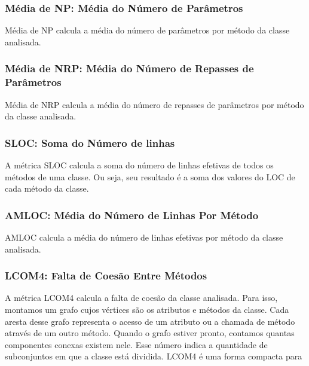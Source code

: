 \subsubsection{Média de NP: Média do Número de Parâmetros}

	Média de NP calcula a média do número de parâmetros por método da classe analisada.
	   


\subsubsection{Média de NRP: Média do Número de Repasses de Parâmetros}        

	Média de NRP calcula a média do número de repasses de parâmetros por método da classe analisada.


                                                        
\subsubsection{SLOC: Soma do Número de linhas}
                                          
	A métrica SLOC calcula a soma do número de linhas efetivas de todos os métodos de uma classe. Ou seja, seu resultado é a soma dos valores do LOC de cada método da classe.



\subsubsection{AMLOC: Média do Número de Linhas Por Método}
                                   
	AMLOC calcula a média do número de linhas efetivas por método da classe analisada.
	


\subsubsection{LCOM4: Falta de Coesão Entre Métodos}
    
	A métrica LCOM4 \citep{HM96} calcula a falta de coesão da classe analisada. Para isso, montamos um grafo cujos vértices são os atributos e métodos da classe. Cada aresta desse grafo representa o acesso de um atributo ou a chamada de método através de um outro método. Quando o grafo estiver pronto, contamos quantas componentes conexas existem nele. Esse número indica a quantidade de subconjuntos em que a classe está dividida. LCOM4 é uma forma compacta para 
	
